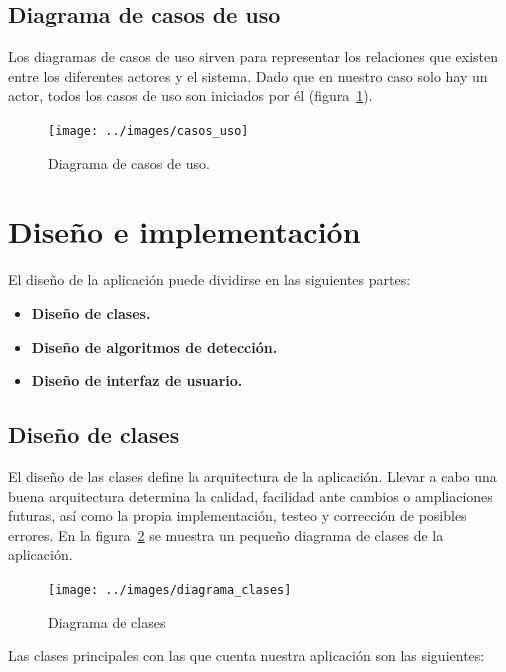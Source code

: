 \subsection{Diagrama de casos de uso}

Los diagramas de casos de uso sirven para representar los relaciones que existen entre los diferentes actores y el sistema. Dado que en nuestro caso solo hay un actor, todos los casos de uso son iniciados por él (figura~\ref{fig:casos_uso}).

\begin{figure}[!ht]
\centering
\texttt{[image: ../images/casos\_uso]}
\caption{Diagrama de casos de uso.}
\label{fig:casos_uso}
\end{figure}




\section{Diseño e implementación}

El diseño de la aplicación puede dividirse en las siguientes partes:


\begin{itemize}
	\item \textbf{Diseño de clases.}
	\item \textbf{Diseño de algoritmos de detección.}
	\item \textbf{Diseño de interfaz de usuario.}
\end{itemize}


\subsection{Diseño de clases}

El diseño de las clases define la arquitectura de la aplicación. Llevar a cabo una buena arquitectura determina la calidad, facilidad ante cambios o ampliaciones futuras, así como la propia implementación, testeo y corrección de posibles errores. En la figura~\ref{fig:diagrama_clases} se muestra un pequeño diagrama de clases de la aplicación.


\begin{figure}
\centering
\texttt{[image: ../images/diagrama\_clases]}
\caption{Diagrama de clases}
\label{fig:diagrama_clases}
\end{figure}


Las clases principales con las que cuenta nuestra aplicación son las siguientes:


